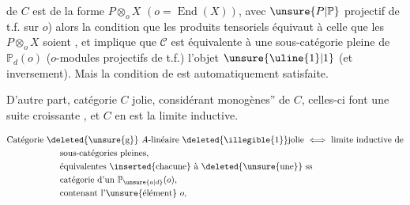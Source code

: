 de $C$ est de la forme $P\otimes_o X$ $(o=\operatorname{End}(X))$, avec $\unsure{P|\mathbb{P}}$ projectif de t.f. sur $o$) alors la condition que les produits tensoriels   équivaut à celle que  les $P\otimes_o X$ soient , et implique que $\mathcal{C}$ est équivalente à une sous-catégorie pleine de $\mathbb{P}_d(o)$ ($o$-modules  projectifs de t.f.)   l'objet $\unsure{\uline{1}|1}$ (et inversement). Mais la condition de  est automatiquement satisfaite.

D'autre part,  catégorie  $C$ jolie, considérant  monogènes'' de $C$, celles-ci font une suite croissante , et $C$ en est la limite inductive.

\[
\begin{aligned}
&\text{Catégorie }\deleted{\text{\unsure{g}}}\ A\text{-linéaire }\deleted{\text{\illegible{1}}}\text{jolie}\ \Longleftrightarrow\ \text{limite inductive de}\\
&\qquad\qquad\qquad\text{sous-catégories pleines,}\\
&\qquad\qquad\qquad\text{équivalentes}\ \inserted{\text{chacune}}\ \text{à}\ \deleted{\text{\unsure{une}}}\ \text{ss}\\
&\qquad\qquad\qquad\text{catégorie d'un }\mathbb{P}_{\unsure{a|d}}(o),\\
&\qquad\qquad\qquad\text{contenant l'\unsure{élément} }o,
\end{aligned}
\]
\margin{(}
